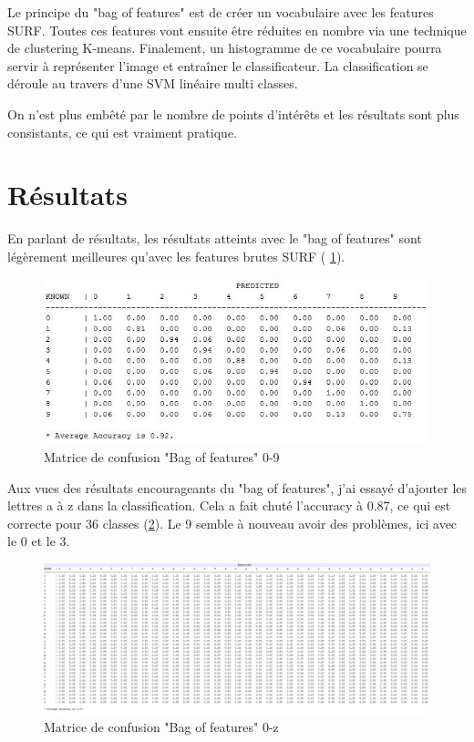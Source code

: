 Le principe du "bag of features" est de créer un vocabulaire avec les features SURF. Toutes ces features vont ensuite être réduites en nombre via une technique de clustering K-means. Finalement, un histogramme de ce vocabulaire pourra servir à représenter l'image et entraîner le classificateur. La classification se déroule au travers d'une SVM linéaire multi classes.

On n'est plus embêté par le nombre de points d'intérêts et les résultats sont plus consistants, ce qui est vraiment pratique.

\section{Résultats}

En parlant de résultats, les résultats atteints avec le "bag of features" sont légèrement meilleures qu'avec les features brutes SURF ( \ref{fig:confusionmatrice2}).

\begin{figure}[h]
\centering
\includegraphics[width=0.8\linewidth]{pictures/bag_confusion_0-9.jpg}
\caption{Matrice de confusion "Bag of features" 0-9}
\label{fig:confusionmatrice2}
\end{figure}

Aux vues des résultats encourageants du "bag of features", j'ai essayé d'ajouter les lettres a à z dans la classification. Cela a fait chuté l'accuracy à 0.87, ce qui est correcte pour 36 classes (\ref{fig:confusionmatrice3}). Le 9 semble à nouveau avoir des problèmes, ici avec le 0 et le 3.

\begin{figure}[h]
\centering
\includegraphics[width=0.8\linewidth]{pictures/bag_confusion_0-z.jpg}
\caption{Matrice de confusion "Bag of features" 0-z}
\label{fig:confusionmatrice3}
\end{figure}

